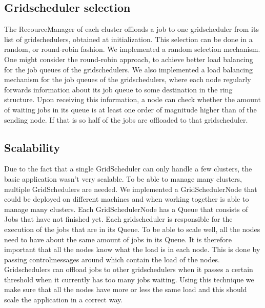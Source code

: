 \documentclass[twocolumn,a4paper]{article}
\begin{document}
\subsection{Gridscheduler selection}
The RecourceManager of each cluster offloads a job to one gridscheduler from its list of gridschedulers, obtained at initialization. This selection can be done in a random, or round-robin fashion. We implemented a random selection mechanism. One might consider the round-robin approach, to achieve better load balancing for the job queues of the gridschedulers. We also implemented a load balancing mechanism for the job queues of the gridschedulers, where each node regularly forwards information about its job queue to some destination in the ring structure. Upon receiving this information, a node can check whether the amount of waiting jobs in its queue is at least one order of magnitude higher than of the sending node. If that is so half of the jobs are offloaded to that gridscheduler.


\subsection{Scalability}
Due to the fact that a single GridScheduler can only handle a few clusters, the basic application wasn't very scalable. To be able to manage many clusters, multiple GridSchedulers are needed. We implemented a  GridSchedulerNode that could be deployed on different machines and when working together is able to manage many clusters. Each GridSchedulerNode has a Queue that consists of Jobs that have not finished yet. Each gridscheduler is responsible for the execution of the jobs that are in its Queue. To be able to scale well, all the nodes need to have about the same amount of jobs in its Queue. It is therefore important that all the nodes know what the load is in each node. This is done by passing controlmessages around which contain the load of the nodes. Gridschedulers can offload jobs to other gridschedulers when it passes a certain threshold when it currently has too many jobs waiting.
Using this technique we make sure that all the nodes have more or less the same load and this should scale the application in a correct way.
\end{document}

